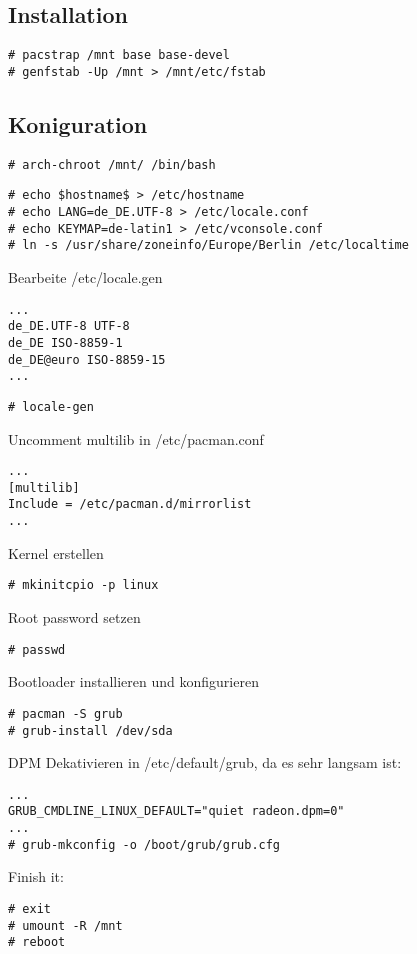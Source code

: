 \subsection{Installation}
\label{subsec:installation}
\begin{lstlisting}[style=Bash]
# pacstrap /mnt base base-devel 
# genfstab -Up /mnt > /mnt/etc/fstab 
\end{lstlisting}

\subsection{Koniguration}
\label{subsec:config}
\begin{lstlisting}[style=Bash]
# arch-chroot /mnt/ /bin/bash
\end{lstlisting}
\begin{lstlisting}[style=Bash]
# echo $hostname$ > /etc/hostname
# echo LANG=de_DE.UTF-8 > /etc/locale.conf
# echo KEYMAP=de-latin1 > /etc/vconsole.conf
# ln -s /usr/share/zoneinfo/Europe/Berlin /etc/localtime
\end{lstlisting}
Bearbeite /etc/locale.gen
\begin{lstlisting}[style=Bash]
...
de_DE.UTF-8 UTF-8
de_DE ISO-8859-1
de_DE@euro ISO-8859-15
...
\end{lstlisting}
\begin{lstlisting}[style=Bash]
# locale-gen 
\end{lstlisting}
Uncomment multilib in /etc/pacman.conf
\begin{lstlisting}[style=Bash]
...
[multilib]
Include = /etc/pacman.d/mirrorlist
...
\end{lstlisting}
Kernel erstellen
\begin{lstlisting}[style=Bash]
# mkinitcpio -p linux
\end{lstlisting}
Root password setzen 
\begin{lstlisting}[style=Bash]
# passwd
\end{lstlisting}
Bootloader installieren und konfigurieren
\begin{lstlisting}[style=Bash]
# pacman -S grub 
# grub-install /dev/sda 
\end{lstlisting}
DPM Dekativieren in /etc/default/grub, da es sehr langsam ist:
\begin{lstlisting}[style=Bash]
...
GRUB_CMDLINE_LINUX_DEFAULT="quiet radeon.dpm=0"
...
# grub-mkconfig -o /boot/grub/grub.cfg 
\end{lstlisting}
Finish it:
\begin{lstlisting}[style=Bash]
# exit 
# umount -R /mnt
# reboot 
\end{lstlisting}

